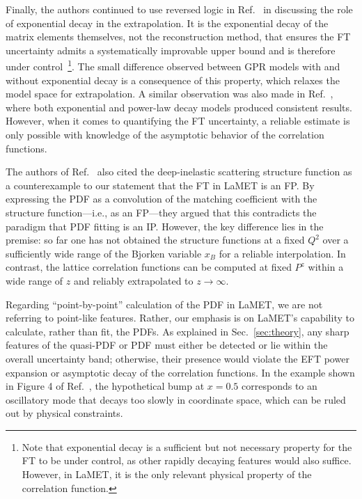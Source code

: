 \documentclass[prd,twocolumn,superscriptaddress,preprintnumbers,showpacs,nofootinbib,notitlepage,floatfix]{revtex4-2}
\DeclareRobustCommand{\sec}[1]{Sec.~\ref{sec:#1}}
\begin{document}
Finally, the authors continued to use reversed logic in Ref.~\cite{Dutrieux:2025axb} in discussing the role of exponential decay in the extrapolation. It is the exponential decay of the matrix elements themselves, not the reconstruction method, that ensures the FT uncertainty admits a systematically improvable upper bound and is therefore under control~\footnote{Note that exponential decay is a sufficient but not necessary property for the FT to be under control, as other rapidly decaying features would also suffice. However, in LaMET, it is the only relevant physical property of the correlation function.}. The small difference observed between GPR models with and without exponential decay is a consequence of this property, which relaxes the model space for extrapolation. A similar observation was also made in Ref.~\cite{Gao:2021dbh}, where both exponential and power-law decay models produced consistent results. However, when it comes to quantifying the FT uncertainty, a reliable estimate is only possible with knowledge of the asymptotic behavior of the correlation functions.

The authors of Ref.~\cite{Dutrieux:2025axb} also cited the deep-inelastic scattering structure function as a counterexample to our statement that the FT in LaMET is an FP. By expressing the PDF as a convolution of the matching coefficient with the structure function---i.e., as an FP---they argued that this contradicts the paradigm that PDF fitting is an IP. However, the key difference lies in the premise: so far one has not obtained the structure functions at a fixed $Q^2$ over a sufficiently wide range of the Bjorken variable $x_B$ for a reliable interpolation. In contrast, the lattice correlation functions can be computed at fixed $P^z$ within a wide range of $z$ and reliably extrapolated to $z \to \infty$.

Regarding ``point-by-point'' calculation of the PDF in LaMET, we are not referring to point-like features. Rather, our emphasis is on LaMET's capability to calculate, rather than fit, the PDFs. As explained in \sec{theory}, any sharp features of the quasi-PDF or PDF must either be detected or lie within the overall uncertainty band; otherwise, their presence would violate the EFT power expansion or asymptotic decay of the correlation functions. In the example shown in Figure 4 of Ref.~\cite{Dutrieux:2025axb}, the hypothetical bump at $x = 0.5$ corresponds to an oscillatory mode that decays too slowly in coordinate space, which can be ruled out by physical constraints.




\end{document}
